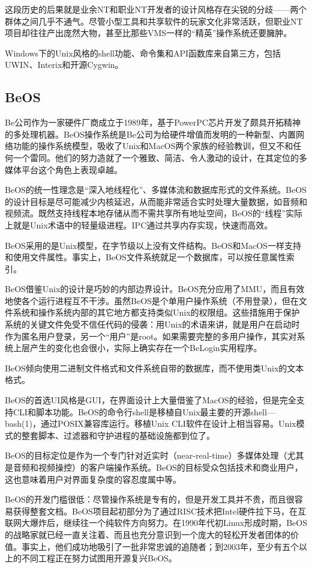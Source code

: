 \documentclass[12pt,oneside]{ctexbook}
\begin{document}
\begin{common-format}
这段历史的后果就是业余NT和职业NT开发者的设计风格存在尖锐的分歧——两个群体之间几乎不通气。尽管小型工具和共享软件的玩家文化非常活跃，但职业NT项目却往往产出庞然大物，甚至比那些VMS一样的“精英”操作系统还要臃肿。

Windows下的Unix风格的shell功能、命令集和API函数库来自第三方，包括UWIN、Interix和开源Cygwin。

\subsection{BeOS}
Be公司作为一家硬件厂商成立于1989年，基于PowerPC芯片开发了颇具开拓精神的多处理机器。BeOS操作系统是Be公司为给硬件增值而发明的一种新型、内置网络功能的操作系统模型，吸收了Unix和MacOS两个家族的经验教训，但又不和任何一个雷同。他们的努力造就了一个雅致、简洁、令人激动的设计，在其定位的多媒体平台这个角色上表现卓越。

BeOS的统一性理念是“深入地线程化”、多媒体流和数据库形式的文件系统。BeOS的设计目标是尽可能减少内核延迟，从而能非常适合实时处理大量数据，如音频和视频流。既然支持线程本地存储从而不需共享所有地址空间，BeOS的“线程”实际上就是Unix术语中的轻量级进程。IPC通过共享内存实现，快速而高效。

BeOS采用的是Unix模型，在字节级以上没有文件结构。BeOS和MacOS一样支持和使用文件属性。事实上，BeOS文件系统就足一个数据库，可以按任意属性索引。

BeOS借鉴Unix的设计是巧妙的内部边界设计。BeOS充分应用了MMU，而且有效地使各个运行进程互不干涉。虽然BeOS是个单用户操作系统（不用登录），但在文件系统和操作系统内部的其它地方都支持类似Unix的权限组。这些措施用于保护系统的关键文件免受不信任代码的侵袭：用Unix的术语来讲，就是用户在启动时作为匿名用户登录，另一个“用户”是root。如果需要完整的多用户操作，其实对系统上层产生的变化也会很小，实际上确实存在一个BeLogin实用程序。

BeOS倾向使用二进制文件格式和文件系统自带的数据库，而不使用类Unix的文本格式。

BeOS的首选UI风格是GUI，在界面设计上大量借鉴了MacOS的经验，但是完全支持CLI和脚本功能。BeOS的命令行shell是移植自Unix最主要的开源shell—bash(1)，通过POSIX兼容库运行。移植Unix CLI软件在设计上相当容易。Unix模式的整套脚本、过滤器和守护进程的基础设施都到位了。

BeOS的目标定位是作为一个专门针对近实时（near-real-time）多媒体处理（尤其是音频和视频操控）的客户端操作系统。BeOS的目标受众包括技术和商业用户，这也意味着用户对界面复杂度的容忍度属中等。

BeOS的开发门槛很低：尽管操作系统是专有的，但是开发工具并不贵，而且很容易获得整套文档。BeOS项目起初部分为了通过RISC技术把Intel硬件拉下马，在互联网大爆炸后，继续往一个纯软件方向努力。在1990年代初Linux形成时期，BeOS的战略家就已经一直关注着、而且也充分意识到一个庞大的轻松开发者团体的价值。事实上，他们成功地吸引了一批非常忠诚的追随者；到2003年，至少有五个以上的不同工程正在努力试图用开源复兴BeOS。


\end{common-format}
\end{document}
